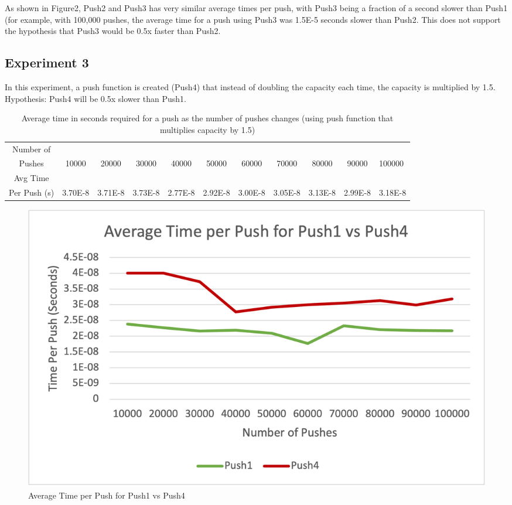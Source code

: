 \documentclass{article}
\begin{document}
As shown in Figure2, Push2 and Push3 has very similar average times per push, with Push3 being a fraction of a second slower than Push1 (for example, with 100,000 pushes, the average time for a push using Push3 was 1.5E-5 seconds slower than Push2. This does not support the hypothesis that Push3 would be 0.5x faster than Push2. 
\pagebreak 

\subsection{Experiment 3}

In this experiment, a push function is created (Push4) that instead of doubling the capacity each time, the capacity is multiplied by 1.5.
Hypothesis: Push4 will be 0.5x slower than Push1.  

\begin{table}[h!]
\centering
\begin{tabular}{c|c|c|c|c|c|c|c|c|c|l}
Number of\\Pushes & 10000 & 20000 & 30000 & 40000 & 50000 & 60000 & 70000 & 80000 & 90000 & 100000 \\\hline
Avg Time\\Per Push (s) & 3.70E-8 & 3.71E-8 & 3.73E-8 & 2.77E-8 & 2.92E-8 & 3.00E-8 & 3.05E-8 & 3.13E-8 & 2.99E-8 & 3.18E-8 \\

\end{tabular}
\caption{\label{tab:widgets}Average time in seconds required for a push as the number of pushes changes (using push function that multiplies capacity by 1.5)}
\end{table}

\begin{figure}[h!]
  \includegraphics[width=\linewidth]{Figure3_0A.png}
  \caption{Average Time per Push for Push1 vs Push4}
  \label{fig:boat1}
\end{figure}
\end{document}
